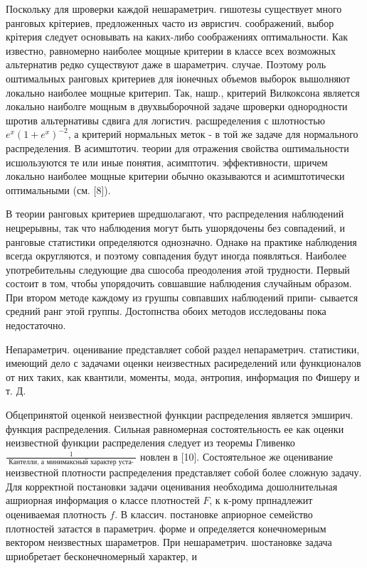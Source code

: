\documentclass[10pt]{article}
\begin{document}
Поскольку для шроверки каждой нешараметрич. гишотезы существует много ранговых крітериев, предложенных часто из әврисгич. соображений, выбор крітерия следует основывать на каких-либо соображениях оптимальности. Как известно, равномерно наиболее мощные критерии в классе всех возможных альтернатив редко существуют даже в шараметрич. случае. Поэтому роль оштимальных ранговых критериев для іюнечных объемов выборок вышолняют локально наиболее мощные критерип. Так, нашр., критерий Вилкоксона является локально наиболге мощным в двухвыборочной задаче шроверки однородности шротив альтернативы сдвига для логистич. расшределения с шлотностью $e^{x}\left(1+e^{x}\right)^{-2}$, а критерий нормальных меток - в той же задаче для нормального распределения. В асимштотич. теории для отражения свойства оштимальности исшользуются те или иные понятия, асимптотич. эффективности, шричем локально наиболее мощные критерии обычно оказываются и асимштотически оптимальными (см. [8]).



В теории ранговых критериев шредшолагают, что распределения наблюдений нецрерывны, так что наблюдения могут быть ушорядочены без совпадений, и ранговые статистики определяются однозначно. Однакө на практике наблюдения всегда округляются, и поэтому совпадения будут иногда появляться. Наиболее употребительны следующие два сшособа преодоления әтой трудности. Первый состоит в том, чтобы упорядочить совшавшие наблюдения случайным образом. При втором методе каждому из грушпы совпавших наблюдений припи- сывается средний ранг этой группы. Достопнства обоих методов исследованы пока недостаточно.



Непараметрич. оценивание представляет собой раздел непараметрич. статистики, имеющий дело с задачами оценки неизвестных расиределений или функционалов от них таких, как квантили, моменты, мода, әнтропия, информация по Фишеру и т. Д.



Обцепринятой оценкой неизвестной функции распределения является эмширич. функция распределения. Сильная равномерная состоятельность ее как оценки неизвестной функции распределения следует из теоремы Гливенко $\frac{1}{\text { Кантелли, а минимаксный характер уста- }}$ новлен в [10]. Состоятельное же оценивание неизвестной плотности распределения представляет собой более сложную задачу. Для корректной постановки задачи оценивания необходима дошолнительная ашриорная информация о классе плотностей $F$, к к-рому прпнадлежит оцениваемая плотность $f$. В классич. постановке априорное семейство плотностей затаєтся в параметрич. форме и определяется конечномерным вектором неизвестных шараметров. При нешараметрич. шостановке задача шриобретает бесконечномерный характер, и
\end{document}
